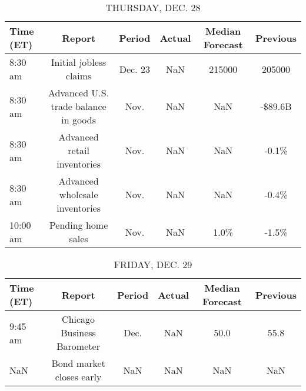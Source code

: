 \documentclass{article}%
\begin{document}
\begin{table}[htbp]%
\caption{THURSDAY, DEC. 28}%
\centering%
\begin{adjustbox}{width=1\textwidth}%
\begin{tabular}{lccccc}
\toprule
Time (ET) &                               Report &  Period & Actual & Median Forecast & Previous \\
\midrule
  8:30 am &               Initial jobless claims & Dec. 23 &    NaN &          215000 &   205000 \\
  8:30 am & Advanced U.S. trade balance in goods &    Nov. &    NaN &             NaN &  -\$89.6B \\
  8:30 am &          Advanced retail inventories &    Nov. &    NaN &             NaN &    -0.1\% \\
  8:30 am &       Advanced wholesale inventories &    Nov. &    NaN &             NaN &    -0.4\% \\
 10:00 am &                   Pending home sales &    Nov. &    NaN &            1.0\% &    -1.5\% \\
\bottomrule
\end{tabular}
%
\end{adjustbox}%
\end{table}

%


\begin{table}[htbp]%
\caption{FRIDAY, DEC. 29}%
\centering%
\begin{adjustbox}{width=1\textwidth}%
\begin{tabular}{lccccc}
\toprule
Time (ET) &                     Report & Period & Actual & Median Forecast & Previous \\
\midrule
  9:45 am & Chicago Business Barometer &   Dec. &    NaN &            50.0 &     55.8 \\
      NaN &   Bond market closes early &    NaN &    NaN &             NaN &      NaN \\
\bottomrule
\end{tabular}
%
\end{adjustbox}%
\end{table}
\end{document}
